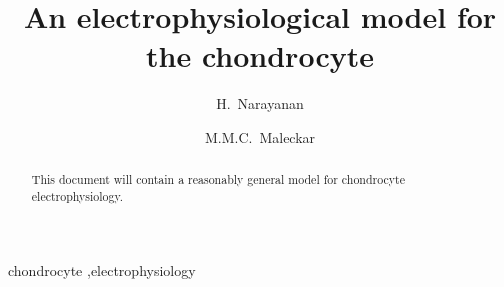 \begin{frontmatter}

\title{An electrophysiological model for the chondrocyte}

\author[srl]{H.~Narayanan}
\author[srl]{M.M.C.~Maleckar}

\address[srl]{Center for Biomedical Computing, Simula Research
  Laboratory, P.O.~Box~134, 1325~Lysaker, Norway}

\begin{abstract}
  This document will contain a reasonably general model for
  chondrocyte electrophysiology.
\end{abstract}

\begin{keyword}
chondrocyte \sep electrophysiology
\end{keyword}

\end{frontmatter}

